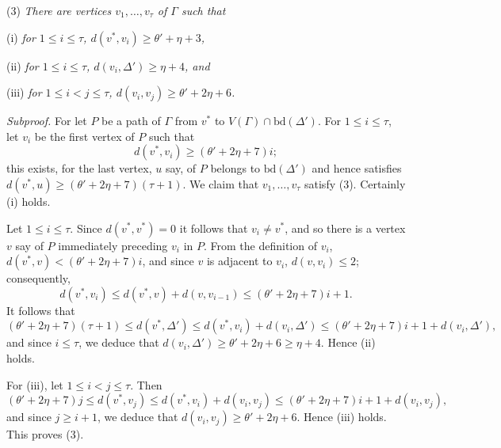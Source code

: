 \hspace*{12pt}(3) \textit{There are vertices $v_1, \dots, v_{\tau}$ of $\Gamma$ such that}

\hspace*{12pt}(i) \textit{for $1 \le i \le \tau$, $d(v^*, v_i) \ge \theta' + \eta + 3$,}

\hspace*{12pt}(ii) \textit{for $1 \le i \le \tau$, $d(v_i, \Delta') \ge \eta + 4$, and}

\hspace*{12pt}(iii) \textit{for $1 \le i < j \le \tau$, $d(v_i, v_j) \ge \theta' + 2\eta + 6$.}

\textit{Subproof.} For let $P$ be a path of $\Gamma$ from $v^*$ to $V(\Gamma) \cap \text{bd}(\Delta')$. For $1 \le i \le \tau$, let $v_i$ be the first vertex of $P$ such that
\begin{equation*}
d(v^*, v_i) \ge (\theta' + 2\eta + 7)i;
\end{equation*}
this exists, for the last vertex, $u$ say, of $P$ belongs to $\text{bd}(\Delta')$ and hence satisfies $d(v^*, u) \ge (\theta' + 2\eta + 7)(\tau + 1)$. We claim that $v_1, \dots, v_{\tau}$ satisfy (3). Certainly (i) holds.

Let $1 \le i \le \tau$. Since $d(v^*, v^*) = 0$ it follows that $v_i \ne v^*$, and so there is a vertex $v$ say of $P$ immediately preceding $v_i$ in $P$. From the definition of $v_i$, $d(v^*, v) < (\theta' + 2\eta + 7)i$, and since $v$ is adjacent to $v_i$, $d(v, v_i) \le 2$; consequently,
\begin{equation*}
d(v^*, v_i) \le d(v^*, v) + d(v, v_{i-1}) \le (\theta' + 2\eta + 7)i + 1.
\end{equation*}
It follows that
\begin{equation*}
(\theta' + 2\eta + 7)(\tau + 1) \le d(v^*, \Delta') \le d(v^*, v_i) + d(v_i, \Delta') \le (\theta' + 2\eta + 7)i + 1 + d(v_i, \Delta'),
\end{equation*}
and since $i \le \tau$, we deduce that $d(v_i, \Delta') \ge \theta' + 2\eta + 6 \ge \eta + 4$. Hence (ii) holds.

For (iii), let $1 \le i < j \le \tau$. Then
\begin{equation*}
(\theta' + 2\eta + 7)j \le d(v^*, v_j) \le d(v^*, v_i) + d(v_i, v_j) \le (\theta' + 2\eta + 7)i + 1 + d(v_i, v_j),
\end{equation*}
and since $j \ge i + 1$, we deduce that $d(v_i, v_j) \ge \theta' + 2\eta + 6$. Hence (iii) holds. This proves (3).


